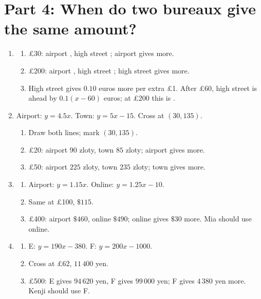 \documentclass[12pt,a4paper]{article}
\begin{document}
\section*{Part 4: When do two bureaux give the same amount?}

\begin{enumerate}[resume]
\item
\begin{enumerate}
\item \pounds30: airport , high street ; airport gives more.
\item \pounds200: airport , high street ; high street gives  more.
\item High street gives \(0.10\) euros more per extra \pounds1. After \pounds60, high street is ahead by \(0.1(x-60)\) euros; at \pounds200 this is .
\end{enumerate}

\item Airport: \(y=4.5x\). Town: \(y=5x-15\). Cross at \((30,135)\).
\begin{enumerate}
\item Draw both lines; mark \((30,135)\).
\item \pounds20: airport \(90\) zloty, town \(85\) zloty; airport gives more.
\item \pounds50: airport \(225\) zloty, town \(235\) zloty; town gives more.
\end{enumerate}

\item
\begin{enumerate}
\item Airport: \(y=1.15x\). Online: \(y=1.25x-10\).
\item Same at \pounds100, \(\$115\).
\item \pounds400: airport \(\$460\), online \(\$490\); online gives \(\$30\) more. Mia should use online.
\end{enumerate}

\item
\begin{enumerate}
\item E: \(y=190x-380\). F: \(y=200x-1000\).
\item Cross at \pounds62, \(11\,400\) yen.
\item \pounds500: E gives \(94\,620\) yen, F gives \(99\,000\) yen; F gives \(4\,380\) yen more. Kenji should use F.
\end{enumerate}
\end{enumerate}
\end{document}
